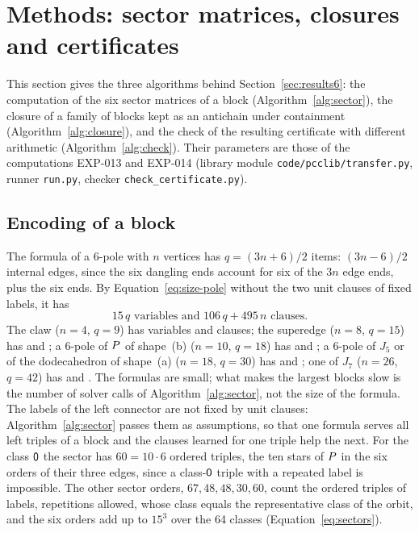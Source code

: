 \section{Methods: sector matrices, closures and certificates}\label{sec:methods}

This section gives the three algorithms behind Section~\ref{sec:results6}: the computation of the six sector matrices
of a block (Algorithm~\ref{alg:sector}), the closure of a family of blocks kept as an antichain under containment
(Algorithm~\ref{alg:closure}), and the check of the resulting certificate with different arithmetic (Algorithm~\ref{alg:check}).
Their parameters are those of the computations EXP-013 and EXP-014 (library module \texttt{code/pcclib/transfer.py},
runner \texttt{run.py}, checker \texttt{check\_certificate.py}).

\subsection{Encoding of a block}\label{sec:encoding}

The formula of a 6-pole with $n$ vertices has $q = (3n + 6)/2$ items: $(3n - 6)/2$ internal edges, since the six
dangling ends account for six of the $3n$ edge ends, plus the six ends. By Equation~\eqref{eq:size-pole} without the two
unit clauses of fixed labels, it has
\begin{equation}\label{eq:size-block}
15\,q \text{ variables and } 106\,q + 495\,n \text{ clauses.}
\end{equation}
The claw ($n = 4$, $q = 9$) has \nVarsBlockY{} variables and \nClausesBlockY{} clauses; the superedge ($n = 8$, $q = 15$) has
\nVarsBlockS{} and \nClausesBlockS{}; a 6-pole of $P$ of shape~(b) ($n = 10$, $q = 18$) has \nVarsBlockPb{} and
\nClausesBlockPb{}; a 6-pole of $J_5$ or of the dodecahedron of shape~(a) ($n = 18$, $q = 30$) has \nVarsBlockJa{} and
\nClausesBlockJa{}; one of $J_7$ ($n = 26$, $q = 42$) has \nVarsBlockJs{} and \nClausesBlockJs{}. The formulas are small; what
makes the largest blocks slow is the number of solver calls of Algorithm~\ref{alg:sector}, not the size of the formula.
The labels of the left connector are not fixed by unit clauses: Algorithm~\ref{alg:sector} passes them as assumptions, so that one formula serves all
left triples of a block and the clauses learned for one triple help the next. For the class $\mathsf{0}$ the sector has $60 = 10 \cdot 6$ ordered triples, the ten stars of $P$ in the six
orders of their three edges, since a class-$\mathsf{0}$ triple with a repeated label is impossible. The other sector orders, $67, 48, 48, 30, 60$, count the ordered triples of labels, repetitions
allowed, whose class equals the representative class of the orbit, and the six orders add up to $15^3$ over the 64 classes (Equation~\eqref{eq:sectors}).

